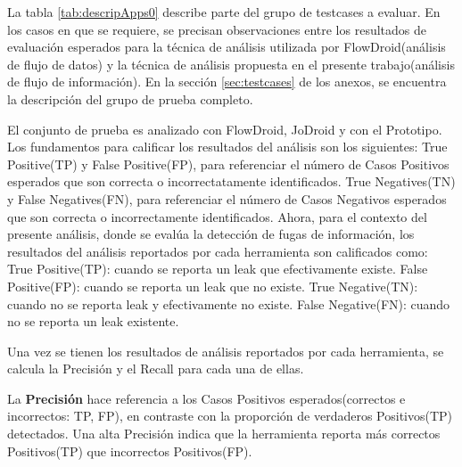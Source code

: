 La tabla \ref{tab:descripApps0} describe parte del grupo de testcases a
evaluar. En los casos en que se requiere, se precisan observaciones entre los
resultados de evaluación esperados para la técnica de análisis utilizada por
FlowDroid(análisis de flujo de datos) y la técnica de análisis propuesta en el
presente trabajo(análisis de flujo de información).
En la sección \ref{sec:testcases} de los anexos, se encuentra la
descripción del grupo de prueba completo.

El conjunto de prueba es analizado con FlowDroid, JoDroid y con el
Prototipo.\newline 
Los fundamentos\cite{Precision-Recall} para calificar los resultados del
análisis son los siguientes:\newline 
True Positive(TP) y False Positive(FP), para referenciar el número de Casos
Positivos esperados que son correcta o incorrectatamente identificados.\newline 
True Negatives(TN) y False Negatives(FN), para referenciar el número de 
Casos Negativos esperados que son correcta o incorrectamente
identificados.\newline
Ahora, para el contexto del presente análisis, donde se evalúa la detección de
fugas de información, los resultados del análisis reportados por cada
herramienta son calificados como:\newline 
True Positive(TP): cuando se reporta un leak que efectivamente existe.\newline
False Positive(FP): cuando se reporta un leak que no existe.\newline 
True Negative(TN): cuando no se reporta leak y efectivamente no existe.\newline
False Negative(FN): cuando no se reporta un leak existente. 

Una vez se tienen los resultados de análisis reportados por cada herramienta, se
calcula la Precisión y el Recall para cada una de ellas.

La \textbf{Precisión} hace referencia a los Casos Positivos esperados(correctos
e incorrectos: TP, FP), en contraste con la proporción de verdaderos Positivos(TP)
detectados\cite{Precision-Recall}. Una alta Precisión indica que la herramienta
reporta más correctos Positivos(TP) que incorrectos Positivos(FP). 

